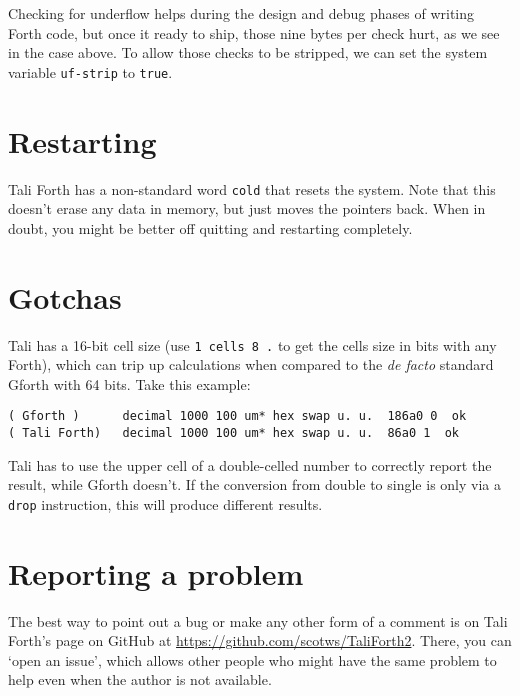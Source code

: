 Checking for underflow helps during the design and debug phases of writing Forth
code, but once it ready to ship, those nine bytes per check hurt, as we see in
the case above. To allow those checks to be stripped, we can set the system
variable \texttt{uf-strip} to \texttt{true}.

\section{Restarting}

Tali Forth has a non-standard word \texttt{cold} that
resets the system. Note that this doesn't erase any data in memory, but just
moves the pointers back. When in doubt, you might be better off quitting and
restarting completely.



\section{Gotchas}

Tali has a 16-bit cell size (use \texttt{1 cells 8 \* .} to get the cells size in
bits with any Forth), which can trip up calculations when compared to the
\textit{de facto} standard Gforth with 64 bits. Take this example:

\begin{lstlisting}[frame=lines]
( Gforth )      decimal 1000 100 um* hex swap u. u.  186a0 0  ok
( Tali Forth)   decimal 1000 100 um* hex swap u. u.  86a0 1  ok
\end{lstlisting}

\noindent Tali has to use the upper cell of a double-celled
number to correctly report the result, while Gforth doesn't. If the conversion
from double to single is only via a \texttt{drop} instruction, this will produce
different results.



\section{Reporting a problem}

The best way to point out a bug or make any other form of a comment is on Tali
Forth's page on GitHub at
\href{https://github.com/scotws/TaliForth2}{https://github.com/scotws/TaliForth2}.
There, you can `open an issue', which allows other people who might have the
same problem to help even when the author is not available.



